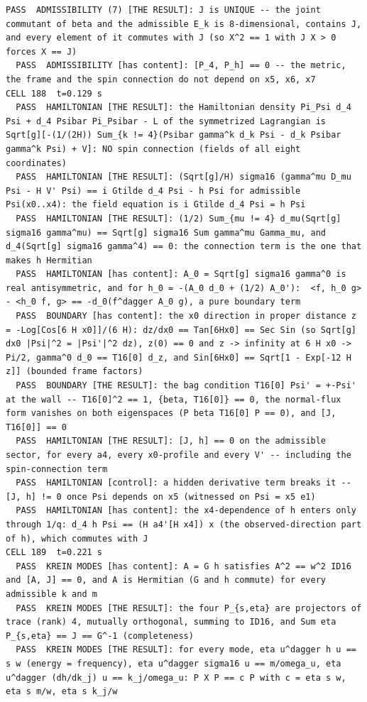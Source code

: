\begin{Verbatim}[fontsize=\scriptsize]
  PASS  ADMISSIBILITY (7) [THE RESULT]: J is UNIQUE -- the joint commutant of beta and the admissible E_k is 8-dimensional, contains J, and every element of it commutes with J (so X^2 == 1 with J X > 0 forces X == J)
  PASS  ADMISSIBILITY [has content]: [P_4, P_h] == 0 -- the metric, the frame and the spin connection do not depend on x5, x6, x7
CELL 188  t=0.129 s
  PASS  HAMILTONIAN [THE RESULT]: the Hamiltonian density Pi_Psi d_4 Psi + d_4 Psibar Pi_Psibar - L of the symmetrized Lagrangian is Sqrt[g][-(1/(2H)) Sum_{k != 4}(Psibar gamma^k d_k Psi - d_k Psibar gamma^k Psi) + V]: NO spin connection (fields of all eight coordinates)
  PASS  HAMILTONIAN [THE RESULT]: (Sqrt[g]/H) sigma16 (gamma^mu D_mu Psi - H V' Psi) == i Gtilde d_4 Psi - h Psi for admissible Psi(x0..x4): the field equation is i Gtilde d_4 Psi = h Psi
  PASS  HAMILTONIAN [THE RESULT]: (1/2) Sum_{mu != 4} d_mu(Sqrt[g] sigma16 gamma^mu) == Sqrt[g] sigma16 Sum gamma^mu Gamma_mu, and d_4(Sqrt[g] sigma16 gamma^4) == 0: the connection term is the one that makes h Hermitian
  PASS  HAMILTONIAN [has content]: A_0 = Sqrt[g] sigma16 gamma^0 is real antisymmetric, and for h_0 = -(A_0 d_0 + (1/2) A_0'):  <f, h_0 g> - <h_0 f, g> == -d_0(f^dagger A_0 g), a pure boundary term
  PASS  BOUNDARY [has content]: the x0 direction in proper distance z = -Log[Cos[6 H x0]]/(6 H): dz/dx0 == Tan[6Hx0] == Sec Sin (so Sqrt[g] dx0 |Psi|^2 = |Psi'|^2 dz), z(0) == 0 and z -> infinity at 6 H x0 -> Pi/2, gamma^0 d_0 == T16[0] d_z, and Sin[6Hx0] == Sqrt[1 - Exp[-12 H z]] (bounded frame factors)
  PASS  BOUNDARY [THE RESULT]: the bag condition T16[0] Psi' = +-Psi' at the wall -- T16[0]^2 == 1, {beta, T16[0]} == 0, the normal-flux form vanishes on both eigenspaces (P beta T16[0] P == 0), and [J, T16[0]] == 0
  PASS  HAMILTONIAN [THE RESULT]: [J, h] == 0 on the admissible sector, for every a4, every x0-profile and every V' -- including the spin-connection term
  PASS  HAMILTONIAN [control]: a hidden derivative term breaks it -- [J, h] != 0 once Psi depends on x5 (witnessed on Psi = x5 e1)
  PASS  HAMILTONIAN [has content]: the x4-dependence of h enters only through 1/q: d_4 h Psi == (H a4'[H x4]) x (the observed-direction part of h), which commutes with J
CELL 189  t=0.221 s
  PASS  KREIN MODES [has content]: A = G h satisfies A^2 == w^2 ID16 and [A, J] == 0, and A is Hermitian (G and h commute) for every admissible k and m
  PASS  KREIN MODES [THE RESULT]: the four P_{s,eta} are projectors of trace (rank) 4, mutually orthogonal, summing to ID16, and Sum eta P_{s,eta} == J == G^-1 (completeness)
  PASS  KREIN MODES [THE RESULT]: for every mode, eta u^dagger h u == s w (energy = frequency), eta u^dagger sigma16 u == m/omega_u, eta u^dagger (dh/dk_j) u == k_j/omega_u: P X P == c P with c = eta s w, eta s m/w, eta s k_j/w

\end{Verbatim}
